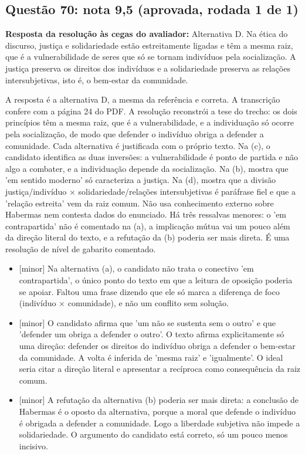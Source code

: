 \documentclass{article}%
\begin{document}
\subsection*{Questão 70: nota 9,5 (aprovada, rodada 1 de 1)}%
\textbf{Resposta da resolução às cegas do avaliador:} Alternativa D. Na ética do discurso, justiça e solidariedade estão estreitamente ligadas e têm a mesma raiz, que é a vulnerabilidade de seres que só se tornam indivíduos pela socialização. A justiça preserva os direitos dos indivíduos e a solidariedade preserva as relações intersubjetivas, isto é, o bem{-}estar da comunidade.\par %
A resposta é a alternativa D, a mesma da referência e correta. A transcrição confere com a página 24 do PDF. A resolução reconstrói a tese do trecho: os dois princípios têm a mesma raiz, que é a vulnerabilidade, e a individuação só ocorre pela socialização, de modo que defender o indivíduo obriga a defender a comunidade. Cada alternativa é justificada com o próprio texto. Na (c), o candidato identifica as duas inversões: a vulnerabilidade é ponto de partida e não algo a combater, e a individuação depende da socialização. Na (b), mostra que 'em sentido moderno' só caracteriza a justiça. Na (d), mostra que a divisão justiça/indivíduo $\times$ solidariedade/relações intersubjetivas é paráfrase fiel e que a 'relação estreita' vem da raiz comum. Não usa conhecimento externo sobre Habermas nem contesta dados do enunciado. Há três ressalvas menores: o 'em contrapartida' não é comentado na (a), a implicação mútua vai um pouco além da direção literal do texto, e a refutação da (b) poderia ser mais direta. É uma resolução de nível de gabarito comentado.%
\begin{itemize}%
\item%
{[}minor{]} Na alternativa (a), o candidato não trata o conectivo 'em contrapartida', o único ponto do texto em que a leitura de oposição poderia se apoiar. Faltou uma frase dizendo que ele só marca a diferença de foco (indivíduo $\times$ comunidade), e não um conflito sem solução.%
\item%
{[}minor{]} O candidato afirma que 'um não se sustenta sem o outro' e que 'defender um obriga a defender o outro'. O texto afirma explicitamente só uma direção: defender os direitos do indivíduo obriga a defender o bem{-}estar da comunidade. A volta é inferida de 'mesma raiz' e 'igualmente'. O ideal seria citar a direção literal e apresentar a recíproca como consequência da raiz comum.%
\item%
{[}minor{]} A refutação da alternativa (b) poderia ser mais direta: a conclusão de Habermas é o oposto da alternativa, porque a moral que defende o indivíduo é obrigada a defender a comunidade. Logo a liberdade subjetiva não impede a solidariedade. O argumento do candidato está correto, só um pouco menos incisivo.%
\end{itemize}%
\end{document}
